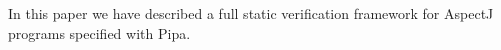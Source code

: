 In this paper we have described a full static verification framework 
for AspectJ programs specified with Pipa.